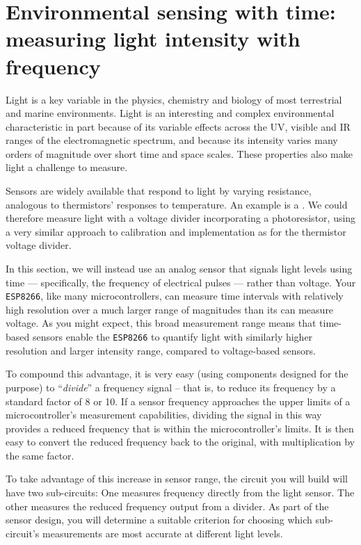 \section{Environmental sensing with time: measuring light intensity with frequency}
Light is a key variable in the physics, chemistry and biology of most terrestrial and marine environments. 
Light is an interesting and complex environmental characteristic in part because of its variable effects across the UV, visible and IR ranges of the electromagnetic spectrum, and because its intensity varies many orders of magnitude over short time and space scales.
These properties also make light a challenge to measure.

Sensors are widely available that respond to light by varying resistance, analogous to thermistors' responses to temperature.
An example is a .
We could therefore measure light with a voltage divider incorporating a photoresistor, using a very similar approach to calibration and implementation as for the thermistor voltage divider. 

In this section, we will instead use an analog sensor that signals light levels using time --- specifically, the frequency of electrical pulses --- rather than voltage. 
Your \texttt{ESP8266}, like many microcontrollers, can measure time intervals with relatively high resolution over a much larger range of magnitudes than its \adc can measure voltage. 
As you might expect, this broad measurement range means that time-based sensors enable the \texttt{ESP8266} to quantify light with similarly higher resolution and larger intensity range, compared to voltage-based sensors.

To compound this advantage, it is very easy (using components designed for the purpose) to ``\emph{divide}'' a frequency signal -- that is, to reduce its frequency by a standard factor of 8 or 10. 
If a sensor frequency approaches the upper limits of a microcontroller's measurement capabilities, dividing the signal in this way provides a reduced frequency that is within the microcontroller's limits. 
It is then easy to convert the reduced frequency back to the original, with multiplication by the same factor.

To take advantage of this increase in sensor range, the circuit you will build will have two sub-circuits: One measures frequency directly from the light sensor.
The other measures the reduced frequency output from a divider. 
As part of the sensor design, you will determine a suitable criterion for choosing which sub-circuit's measurements are most accurate at different light levels.

